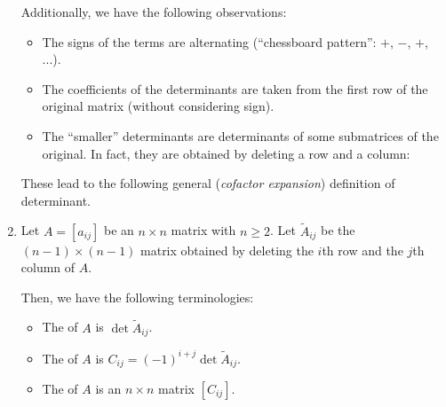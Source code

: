 \begin{enumerate}
Additionally, we have the following observations:
\begin{itemize}
\item The signs of the terms are alternating (``chessboard pattern'': \(+\),
\(-\), \(+\), ...).
\item The coefficients of the determinants are taken from the first row of the
original matrix (without considering sign).
\item The ``smaller'' determinants are determinants of some submatrices of the
original. In fact, they are obtained by deleting a row and a column:
\begin{center}
\quad
{}
\quad
{}
\end{center}
\end{itemize}
These lead to the following general (\emph{cofactor expansion}) definition of
determinant.

\item Let \(A=[a_{ij}]\) be an \(n\times n\) matrix with \(n\ge 2\). Let
\(\widetilde{A}_{ij}\) be the \((n-1)\times (n-1)\) matrix obtained by deleting
the \(i\)th row and the \(j\)th column of \(A\).

Then, we have the following terminologies:
\begin{itemize}
\item The  of \(A\) is \(\det \widetilde{A}_{ij}\).
\item The  of \(A\) is \(C_{ij}=(-1)^{i+j}\det \widetilde{A}_{ij}\).
\item The  of \(A\) is an \(n\times n\) matrix \([C_{ij}]\).
\end{itemize}


\end{enumerate}
